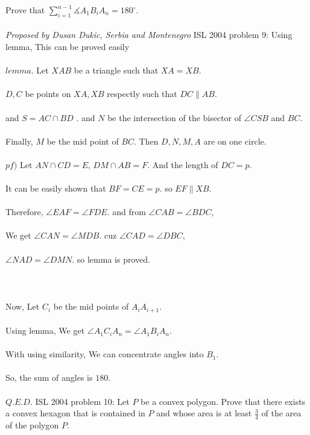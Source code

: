Prove that $\sum_{i=1}^{n-1} \measuredangle A_1B_iA_n=180^{\circ}$. \\\\
\textit{Proposed by Dusan Dukic, Serbia and Montenegro} 
ISL 2004 problem 9:  Using lemma, This can be proved easily \\\\
$lemma$. Let $XAB$ be a triangle such that $XA=XB$. \\\\
$D, C$ be points on $XA, XB$ respectly such that $DC \parallel AB$. \\\\
and $S= AC \cap BD$ . and $N$ be the intersection of the bisector of $\angle CSB$ and $BC$. \\\\
Finally, $M$ be the mid point of $BC$. Then $D, N, M, A$ are on one circle. \\\\
$pf)$ Let $AN \cap CD = E$, $DM\cap AB = F$. And the length of $DC=p$. \\\\
It can be easily shown that $BF=CE=p$. so $EF\parallel XB$. \\\\
Therefore, $\angle EAF=\angle FDE$. and from $\angle CAB=\angle BDC$, \\\\
We get $\angle CAN = \angle MDB$. cuz $\angle CAD= \angle DBC$, \\\\
$\angle NAD = \angle DMN$. so lemma is proved. \\\\\\\\
Now, Let $C_i$ be the mid points of $A_i A_{i+1}$. \\\\
Using lemma, We get $\angle A_1 C_i A_n = \angle A_1 B_i A_n$. \\\\
With using similarity, We can concentrate angles into $B_1$. \\\\
So, the sum of angles is $180$. \\\\
$Q.E.D.$ 
ISL 2004 problem 10:  Let $P$ be a convex polygon. Prove that there exists a convex hexagon that is contained in $P$ and whose area is at least $\frac34$ of the area of the polygon $P$. \\\\

